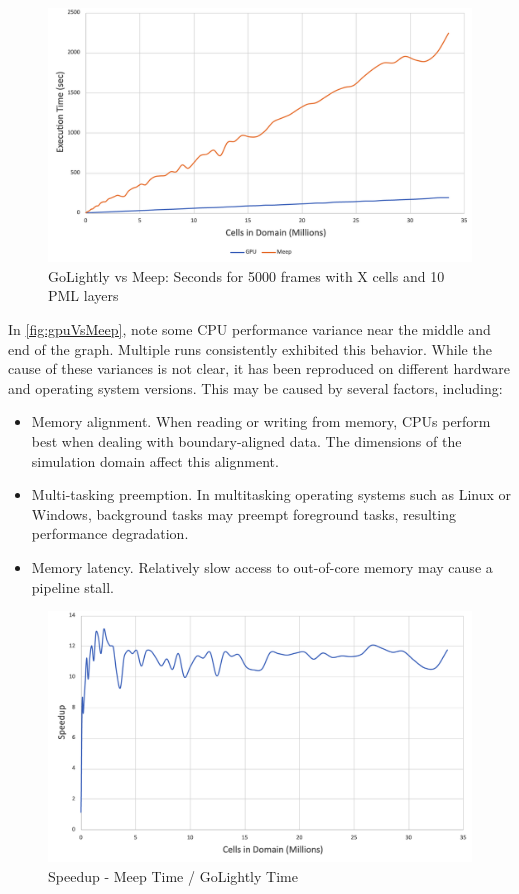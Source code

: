 \begin{figure}[H]
	\centering
	\includegraphics[width=\textwidth,
	keepaspectratio]{gpu-vs-meep.png}
	\caption{GoLightly vs Meep: Seconds for 5000 frames with X cells and 10 PML layers}
	\label{fig:gpuVsMeep}
\end{figure}

In \autoref{fig:gpuVsMeep}, note some CPU performance variance near the middle and end of the graph. Multiple runs consistently exhibited this behavior. While the cause of these variances is not clear, it has been reproduced on different hardware and operating system versions. 
This may be caused by several factors, including:

\begin{itemize}
	\item Memory alignment. When reading or writing from memory, CPUs perform best when dealing with boundary-aligned data. The dimensions of the simulation domain affect this alignment.
	\item Multi-tasking preemption. In multitasking operating systems such as Linux or Windows, background tasks may preempt foreground tasks, resulting performance degradation. 
	\item Memory latency. Relatively slow access to out-of-core memory may cause a pipeline stall.	
\end{itemize}


\begin{figure}[H]
	\centering
	\includegraphics[width=\textwidth,
	keepaspectratio]{gpu-vs-meep-speedup.png}
	\caption{Speedup - Meep Time / GoLightly Time}
	\label{fig:gpuVsMeepSpeedup}
\end{figure}

